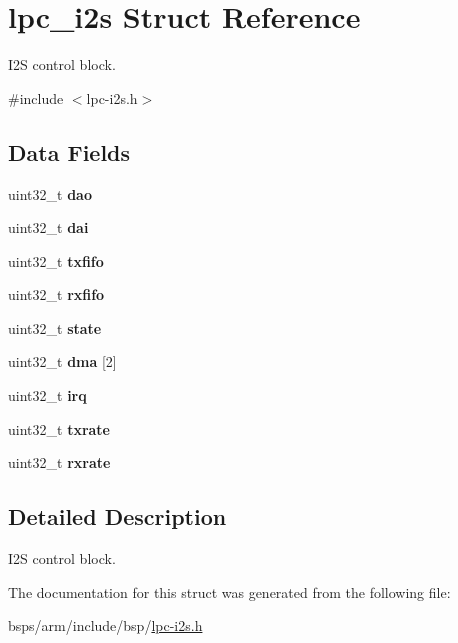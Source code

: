\hypertarget{structlpc__i2s}{}\section{lpc\+\_\+i2s Struct Reference}
\label{structlpc__i2s}


I2S control block.  




{\ttfamily \#include $<$lpc-\/i2s.\+h$>$}

\subsection*{Data Fields}
\begin{DoxyCompactItemize}
\item 
\mbox{\label{structlpc__i2s_a5cd2c9790fa6381b7536a5a1a0667878}} 
uint32\+\_\+t {\bfseries dao}
\item 
\mbox{\label{structlpc__i2s_adbddb29587eec3ba177648f093b71706}} 
uint32\+\_\+t {\bfseries dai}
\item 
\mbox{\label{structlpc__i2s_acce11d61668daede69aaf66b48af2ef0}} 
uint32\+\_\+t {\bfseries txfifo}
\item 
\mbox{\label{structlpc__i2s_a2c63ca133e5b414bd37ebd1adce9a0bf}} 
uint32\+\_\+t {\bfseries rxfifo}
\item 
\mbox{\label{structlpc__i2s_a0d0e277c0f1c3b218744f1a461d90b37}} 
uint32\+\_\+t {\bfseries state}
\item 
\mbox{\label{structlpc__i2s_a9794abf7151355c605726aa01ebd8ff0}} 
uint32\+\_\+t {\bfseries dma} \mbox{[}2\mbox{]}
\item 
\mbox{\label{structlpc__i2s_a4a742ecf6773ea30dc3ac4bcefaa437e}} 
uint32\+\_\+t {\bfseries irq}
\item 
\mbox{\label{structlpc__i2s_aeeb33660eaba5c6914e516faafcf337c}} 
uint32\+\_\+t {\bfseries txrate}
\item 
\mbox{\label{structlpc__i2s_a3316dc2852e3e08f453e78cad074ee3f}} 
uint32\+\_\+t {\bfseries rxrate}
\end{DoxyCompactItemize}


\subsection{Detailed Description}
I2S control block. 

The documentation for this struct was generated from the following file\+:\begin{DoxyCompactItemize}
\item 
bsps/arm/include/bsp/\mbox{\hyperlink{lpc-i2s_8h}{lpc-\/i2s.\+h}}\end{DoxyCompactItemize}
